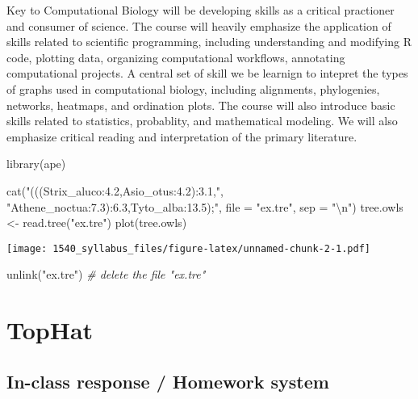 \documentclass[
]{book}
\newenvironment{Shaded}{\begin{snugshade}}{\end{snugshade}}
\newcommand{\AttributeTok}[1]{\textcolor[rgb]{0.77,0.63,0.00}{#1}}
\newcommand{\CommentTok}[1]{\textcolor[rgb]{0.56,0.35,0.01}{\textit{#1}}}
\newcommand{\FunctionTok}[1]{\textcolor[rgb]{0.00,0.00,0.00}{#1}}
\newcommand{\NormalTok}[1]{#1}
\newcommand{\OtherTok}[1]{\textcolor[rgb]{0.56,0.35,0.01}{#1}}
\newcommand{\SpecialCharTok}[1]{\textcolor[rgb]{0.00,0.00,0.00}{#1}}
\newcommand{\StringTok}[1]{\textcolor[rgb]{0.31,0.60,0.02}{#1}}
\begin{document}
Key to Computational Biology will be developing skills as a critical practioner and consumer of science. The course will heavily emphasize the application of skills related to scientific programming, including understanding and modifying R code, plotting data, organizing computational workflows, annotating computational projects. A central set of skill we be learnign to intepret the types of graphs used in computational biology, including alignments, phylogenies, networks, heatmaps, and ordination plots. The course will also introduce basic skills related to statistics, probablity, and mathematical modeling. We will also emphasize critical reading and interpretation of the primary literature.

\begin{Shaded}
\begin{Highlighting}[]
\FunctionTok{library}\NormalTok{(ape)}

\FunctionTok{cat}\NormalTok{(}\StringTok{"(((Strix\_aluco:4.2,Asio\_otus:4.2):3.1,"}\NormalTok{,}
\StringTok{"Athene\_noctua:7.3):6.3,Tyto\_alba:13.5);"}\NormalTok{,}
\AttributeTok{file =} \StringTok{"ex.tre"}\NormalTok{, }\AttributeTok{sep =} \StringTok{"}\SpecialCharTok{\textbackslash{}n}\StringTok{"}\NormalTok{)}
\NormalTok{tree.owls }\OtherTok{\textless{}{-}} \FunctionTok{read.tree}\NormalTok{(}\StringTok{"ex.tre"}\NormalTok{)}
\FunctionTok{plot}\NormalTok{(tree.owls)}
\end{Highlighting}
\end{Shaded}

\texttt{[image: 1540\_syllabus\_files/figure-latex/unnamed-chunk-2-1.pdf]}

\begin{Shaded}
\begin{Highlighting}[]
\FunctionTok{unlink}\NormalTok{(}\StringTok{"ex.tre"}\NormalTok{) }\CommentTok{\# delete the file "ex.tre"}
\end{Highlighting}
\end{Shaded}

\hypertarget{tophat}{%
\chapter{TopHat}\label{tophat}}

\hypertarget{in-class-response-homework-system}{%
\section{In-class response / Homework system}\label{in-class-response-homework-system}}
\end{document}
